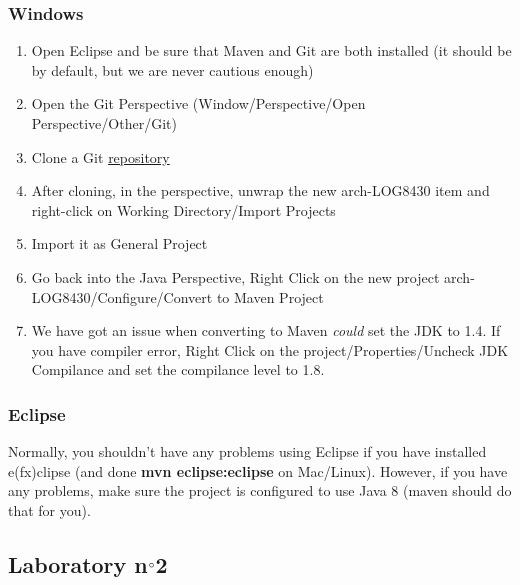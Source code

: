 \documentclass{report}
\begin{document}
\subsubsection{Windows}
\begin{enumerate}
\item Open Eclipse and be sure that Maven and Git are both installed (it should be by default, but we are never cautious enough)
\item Open the Git Perspective (Window/Perspective/Open Perspective/Other/Git)
\item Clone a Git \href{https://github.com/cnamal/arch-LOG8430}{repository}
\item After cloning, in the perspective, unwrap the new arch-LOG8430 item and right-click on Working Directory/Import Projects
\item Import it as General Project
\item Go back into the Java Perspective, Right Click on the new project arch-LOG8430/Configure/Convert to Maven Project 
\item We have got an issue when converting to Maven \emph{could} set the JDK to 1.4. If you have compiler error, Right Click on the project/Properties/Uncheck JDK Compilance and set the compilance level to 1.8.
\end{enumerate}


\subsubsection{Eclipse}
Normally, you shouldn't have any problems using Eclipse if you have installed e(fx)clipse (and done \textbf{mvn eclipse:eclipse} on Mac/Linux). However, if you have any problems, make sure the project is configured to use Java 8 (maven should do that for you).

\subsection{Laboratory n$\degree$2}
\label{Usage::lab2}
\end{document}

